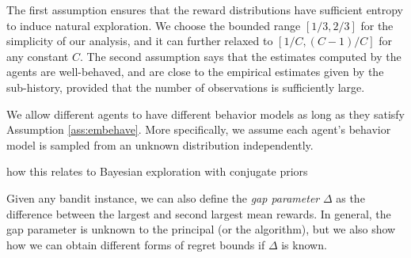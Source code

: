 The first assumption ensures that the reward distributions have
sufficient entropy to induce natural exploration. We choose the
bounded range $[1/3, 2/3]$ for the simplicity of our analysis, and it
can further relaxed to $[1/C, (C-1)/C]$ for any constant $C$. The
second assumption says that the estimates computed by the agents are
well-behaved, and are close to the empirical estimates given by the
sub-history, provided that the number of observations is sufficiently
large.


We allow different agents to have different behavior models as long as
they satisfy Assumption \ref{ass:embehave}. More specifically, we
assume each agent's behavior model is sampled from an unknown
distribution independently. 
\begin{remark}
  how this relates to Bayesian exploration with conjugate
  priors
\end{remark}

Given any bandit instance, we can also define the \emph{gap parameter}
$\Delta$ as the difference between the largest and second largest mean
rewards. In general, the gap parameter is unknown to the principal (or
the algorithm), but we also show how we can obtain different forms of
regret bounds if $\Delta$ is known.



